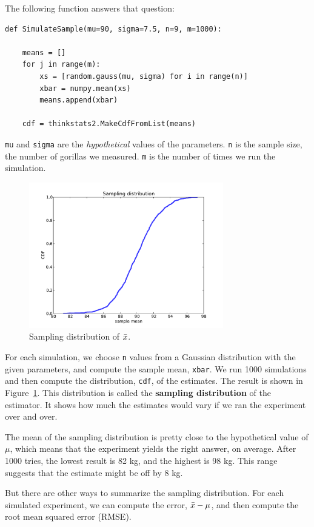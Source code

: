 \documentclass[12pt]{book}
\begin{document}
The following function answers that question:

\begin{verbatim}
def SimulateSample(mu=90, sigma=7.5, n=9, m=1000):
    
    means = []
    for j in range(m):
        xs = [random.gauss(mu, sigma) for i in range(n)]
        xbar = numpy.mean(xs)
        means.append(xbar)

    cdf = thinkstats2.MakeCdfFromList(means)
\end{verbatim}

{\tt mu} and {\tt sigma} are the {\em hypothetical} values of
the parameters.  {\tt n} is the sample size, the number of
gorillas we measured.  {\tt m} is the number of times we run
the simulation.

\begin{figure}
\centerline{\includegraphics[height=2.5in]{figs/estimate1.pdf}}
\caption{Sampling distribution of $\bar{x}$.}
\label{fig.sampling}
\end{figure}

For each simulation, we choose {\tt n} values from a Gaussian
distribution with the given parameters, and compute the sample mean,
{\tt xbar}.  We run 1000 simulations and then compute the
distribution, {\tt cdf}, of the estimates.  The result is shown in
Figure~\ref{fig.sampling}.  This distribution is called the {\bf
  sampling distribution} of the estimator.  It shows how much the
estimates would vary if we ran the experiment over and over.

The mean of the sampling distribution is pretty close
to the hypothetical value of $\mu$, which means that the experiment
yields the right answer, on average.  After 1000 tries, the lowest
result is 82 kg, and the highest is 98 kg.  This range suggests that
the estimate might be off by 8 kg.  

But there are other ways to summarize the sampling distribution.
For each simulated experiment, we can compute the error, $\bar{x} - \mu$,
and then compute the root mean squared error (RMSE).
\end{document}
